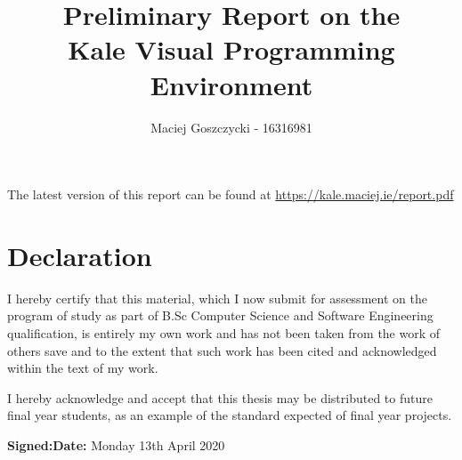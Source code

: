 \documentclass[11pt]{report}
\title{Preliminary Report on the \\ Kale Visual Programming Environment}
\author{Maciej Goszczycki - 16316981}
\date{\versionBox}
\newenvironment{callouttip}[1]{
    \begin{mdframed}[style=titlecallout,
        linecolor=calloutborder, backgroundcolor=calloutbg,
        frametitle={#1}]
}{
	\medskip
    \end{mdframed}
}
\begin{document}




\begin{callouttip}
\normalfont{The latest version of this report can be found at}
\url{https://kale.maciej.ie/report.pdf}
\end{callouttip}
\tableofcontents
\clearpage
\section*{Declaration}
\vspace{0.10\paperheight}
I hereby certify that this material, which I now submit for assessment
on the program of study as part of B.Sc Computer Science and Software
Engineering qualification,
is entirely my own work and has not been taken from the work of others 
save and to the extent that such work has been cited and acknowledged
within the text of my work. 

\vspace{0.10\paperheight}
\noindent I hereby acknowledge and accept that this thesis may be distributed to
future final year students, as an example of the standard expected of
final year projects.
\vspace{0.20\paperheight}

\textbf{Signed:}\hfill \textbf{Date:} Monday 13th April 2020
\clearpage

\setcounter{page}{1}

\setlength\intextsep{0pt}

\DefineShortVerb{\|}



















\renewcommand*{\bibfont}{\raggedright}

\clearpage


\begin{appendices}
	
	
	
\end{appendices}
\end{document}
